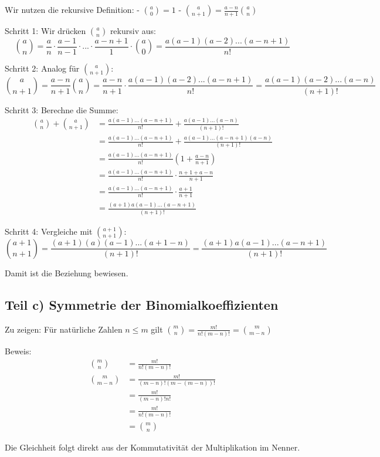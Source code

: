 \documentclass{article}
\begin{document}
Wir nutzen die rekursive Definition:
- $\binom{a}{0} = 1$
- $\binom{a}{n + 1} = \frac{a - n}{n + 1} \binom{a}{n}$

Schritt 1: Wir drücken $\binom{a}{n}$ rekursiv aus:
$$\binom{a}{n} = \frac{a}{n} \cdot \frac{a-1}{n-1} \cdot ... \cdot \frac{a-n+1}{1} \cdot \binom{a}{0} = \frac{a(a-1)(a-2)...(a-n+1)}{n!}$$

Schritt 2: Analog für $\binom{a}{n+1}$:
$$\binom{a}{n+1} = \frac{a-n}{n+1} \binom{a}{n} = \frac{a-n}{n+1} \cdot \frac{a(a-1)(a-2)...(a-n+1)}{n!} = \frac{a(a-1)(a-2)...(a-n)}{(n+1)!}$$

Schritt 3: Berechne die Summe:
\begin{align}
\binom{a}{n} + \binom{a}{n+1} &= \frac{a(a-1)...(a-n+1)}{n!} + \frac{a(a-1)...(a-n)}{(n+1)!} \\
&= \frac{a(a-1)...(a-n+1)}{n!} + \frac{a(a-1)...(a-n+1)(a-n)}{(n+1)!} \\
&= \frac{a(a-1)...(a-n+1)}{n!} \left(1 + \frac{a-n}{n+1}\right) \\
&= \frac{a(a-1)...(a-n+1)}{n!} \cdot \frac{n+1+a-n}{n+1} \\
&= \frac{a(a-1)...(a-n+1)}{n!} \cdot \frac{a+1}{n+1} \\
&= \frac{(a+1)a(a-1)...(a-n+1)}{(n+1)!}
\end{align}

Schritt 4: Vergleiche mit $\binom{a+1}{n+1}$:
$$\binom{a+1}{n+1} = \frac{(a+1)(a)(a-1)...(a+1-n)}{(n+1)!} = \frac{(a+1)a(a-1)...(a-n+1)}{(n+1)!}$$

Damit ist die Beziehung bewiesen.

\subsection*{Teil c) Symmetrie der Binomialkoeffizienten}

Zu zeigen: Für natürliche Zahlen $n \leq m$ gilt $\binom{m}{n} = \frac{m!}{n!(m-n)!} = \binom{m}{m-n}$

Beweis:
\begin{align}
\binom{m}{n} &= \frac{m!}{n!(m-n)!} \\
\binom{m}{m-n} &= \frac{m!}{(m-n)!(m-(m-n))!} \\
&= \frac{m!}{(m-n)!n!} \\
&= \frac{m!}{n!(m-n)!} \\
&= \binom{m}{n}
\end{align}

Die Gleichheit folgt direkt aus der Kommutativität der Multiplikation im Nenner.
\end{document}
